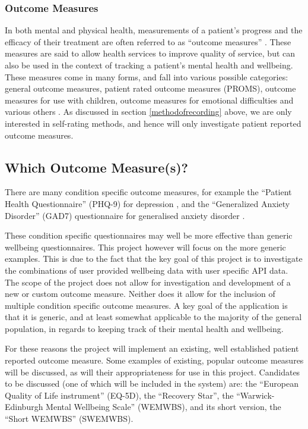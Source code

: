 \documentclass[11pt,openright,a4paper]{report}
\begin{document}
\subsubsection{Outcome Measures}
In both mental and physical health, measurements of a patient's progress and the efficacy of their treatment are often referred to as \enquote{outcome measures} \parencite{pediaoutcomemeasures}. These measures are said to allow health services to improve quality of service, but can also be used in the context of tracking a patient's mental health and wellbeing. These measures come in many forms, and fall into various possible categories: general outcome measures, patient rated outcome measures (PROMS), outcome measures for use with children, outcome measures for emotional difficulties and various others \parencite{mhpoutcomemeasures}. As discussed in section \ref{methodofrecording} above, we are only interested in self-rating methods, and hence will only investigate patient reported outcome measures.

\subsection{Which Outcome Measure(s)?} \label{whichoutcomemeasures}
There are many condition specific outcome measures, for example the \enquote{Patient Health Questionnaire} (PHQ-9) for depression \parencite{kroenke2001phq}, and the \enquote{Generalized Anxiety Disorder} (GAD7) questionnaire for generalised anxiety disorder \parencite{spitzer2006brief}.

These condition specific questionnaires may well be more effective than generic wellbeing questionnaires. This project however will focus on the more generic examples. This is due to the fact that the key goal of this project is to investigate the combinations of user provided wellbeing data with user specific API data. The scope of the project does not allow for investigation and development of a new or custom outcome measure. Neither does it allow for the inclusion of multiple condition specific outcome measures. A key goal of the application is that it is generic, and at least somewhat applicable to the majority of the general population, in regards to keeping track of their mental health and wellbeing.

For these reasons the project will implement an existing, well established patient reported outcome measure. Some examples of existing, popular outcome measures will be discussed, as will their appropriateness for use in this project. Candidates to be discussed (one of which will be included in the system) are: the \enquote{European Quality of Life instrument} (EQ-5D), the \enquote{Recovery Star}, the \enquote{Warwick-Edinburgh Mental Wellbeing Scale} (WEMWBS), and its short version, the \enquote{Short WEMWBS} (SWEMWBS).
\end{document}
